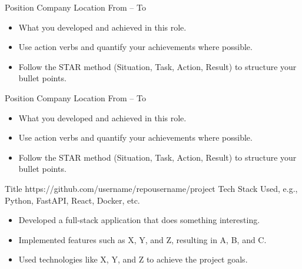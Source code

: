 \documentclass[10pt, a4paper]{styles}
\begin{document}
%
\makecvheader


    \company
        {Position}
        {Company}
        {Location}
        {From -- To}
        \begin{itemize}
          \item What you developed and achieved in this role.
          \item Use action verbs and quantify your achievements where possible.
          \item Follow the STAR method (Situation, Task, Action, Result) to structure your bullet points.
        \end{itemize}

    \company
        {Position}
        {Company}
        {Location}
        {From -- To}
        \begin{itemize}
          \item What you developed and achieved in this role.
          \item Use action verbs and quantify your achievements where possible.
          \item Follow the STAR method (Situation, Task, Action, Result) to structure your bullet points.
        \end{itemize}



    \project
        {Title}
        {https://github.com/username/repo}{username/project}
        {Tech Stack Used, e.g., Python, FastAPI, React, Docker, etc.}
        \begin{itemize}
            \item Developed a full-stack application that does something interesting.
            \item Implemented features such as X, Y, and Z, resulting in A, B, and C.
            \item Used technologies like X, Y, and Z to achieve the project goals.
        \end{itemize}
    \dividergray
    
\end{document}
